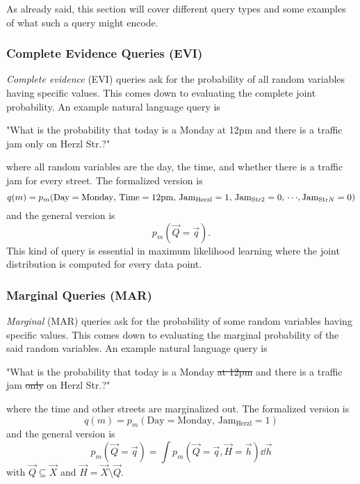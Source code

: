 			As already said, this section will cover different query types and some examples of what such a query might encode.

			\subsubsection{Complete Evidence Queries (EVI)}
				\emph{Complete evidence} (EVI) queries ask for the probability of all random variables having specific values. This comes down to evaluating the complete joint probability. An example natural language query is
				\begin{center}
					"What is the probability that today is a Monday at 12pm and there is a traffic jam only on Herzl Str.?"
				\end{center}
				where all random variables are the day, the time, and whether there is a traffic jam for every street. The formalized version is
				\begin{equation}
					q(m) = p_m(\text{Day} = \text{Monday},\, \text{Time} = \text{12pm},\, \text{Jam}_\text{Herzl} = 1,\, \text{Jam}_{\text{Str}2} = 0,\,\cdots\!,\text{Jam}_{\text{Str}N} = 0)
				\end{equation}
				and the general version is
				\begin{equation}
					p_m(\vec{Q} = \vec{q}).
				\end{equation}
				This kind of query is essential in maximum likelihood learning where the joint distribution is computed for every data point.

			\subsubsection{Marginal Queries (MAR)}
				\emph{Marginal} (MAR) queries ask for the probability of some random variables having specific values. This comes down to evaluating the marginal probability of the said random variables. An example natural language query is
				\begin{center}
					"What is the probability that today is a Monday \sout{at 12pm} and there is a traffic jam \sout{only} on Herzl Str.?"
				\end{center}
				where the time and other streets are marginalized out. The formalized version is
				\begin{equation}
					q(m) = p_m(\text{Day} = \text{Monday},\, \text{Jam}_\text{Herzl} = 1)
				\end{equation}
				and the general version is
				\begin{equation}
					p_m(\vec{Q} = \vec{q}) = \int\! p_m(\vec{Q} = \vec{q}, \vec{H} = \vec{h}) \dd{\vec{h}}
				\end{equation}
				with \( \vec{Q} \subseteq \vec{X} \) and \( \vec{H} = \vec{X} \setminus \vec{Q} \).

